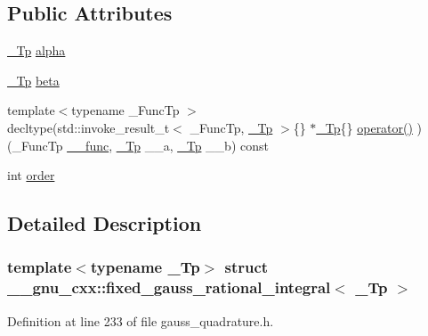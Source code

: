 \subsection*{Public Attributes}
\begin{DoxyCompactItemize}
\item 
\hyperlink{namespace____gnu__cxx_a3b19a9c800ca194374ef9172290f7d79}{\+\_\+\+Tp} \hyperlink{struct____gnu__cxx_1_1fixed__gauss__rational__integral_afce7345b6772928485c8d6ce8e08769b}{alpha}
\item 
\hyperlink{namespace____gnu__cxx_a3b19a9c800ca194374ef9172290f7d79}{\+\_\+\+Tp} \hyperlink{struct____gnu__cxx_1_1fixed__gauss__rational__integral_aa6c563ee188859be79a987b67312d7ac}{beta}
\item 
{\footnotesize template$<$typename \+\_\+\+Func\+Tp $>$ }\\decltype(std\+::invoke\+\_\+result\+\_\+t$<$ \+\_\+\+Func\+Tp, \hyperlink{namespace____gnu__cxx_a3b19a9c800ca194374ef9172290f7d79}{\+\_\+\+Tp} $>$\{\} $\ast$\hyperlink{namespace____gnu__cxx_a3b19a9c800ca194374ef9172290f7d79}{\+\_\+\+Tp}\{\} \hyperlink{struct____gnu__cxx_1_1fixed__gauss__rational__integral_aa58df016c4139a1001cd3b155cc50256}{operator()} )(\+\_\+\+Func\+Tp \hyperlink{namespace____gnu__cxx_af2b2f0c7a2ae72b922b1afefae5a65b2}{\+\_\+\+\_\+func}, \hyperlink{namespace____gnu__cxx_a3b19a9c800ca194374ef9172290f7d79}{\+\_\+\+Tp} \+\_\+\+\_\+a, \hyperlink{namespace____gnu__cxx_a3b19a9c800ca194374ef9172290f7d79}{\+\_\+\+Tp} \+\_\+\+\_\+b) const
\item 
int \hyperlink{struct____gnu__cxx_1_1fixed__gauss__rational__integral_a5998f7b5975013c67c95c2bacc279857}{order}
\end{DoxyCompactItemize}


\subsection{Detailed Description}
\subsubsection*{template$<$typename \+\_\+\+Tp$>$\newline
struct \+\_\+\+\_\+gnu\+\_\+cxx\+::fixed\+\_\+gauss\+\_\+rational\+\_\+integral$<$ \+\_\+\+Tp $>$}



Definition at line 233 of file gauss\+\_\+quadrature.\+h.



